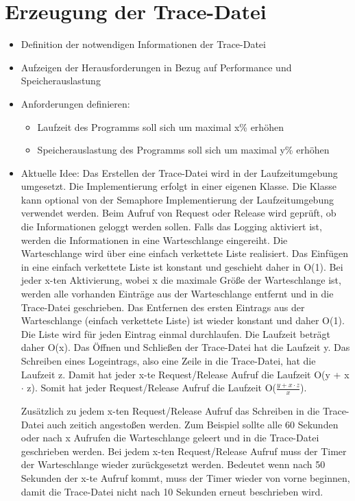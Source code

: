\section{Erzeugung der Trace-Datei}
\label{section:Erzeugung der Trace-Datei}
\begin{itemize}
    \item Definition der notwendigen Informationen der Trace-Datei
    \item Aufzeigen der Herausforderungen in Bezug auf Performance und
    Speicherauslastung
  \item Anforderungen definieren:
  \begin{itemize}
    \item Laufzeit des Programms soll sich um maximal x\% erhöhen
    \item Speicherauslastung des Programms soll sich um maximal y\% erhöhen
  \end{itemize}
    \item Aktuelle Idee:
    Das Erstellen der Trace-Datei wird in der Laufzeitumgebung umgesetzt. Die Implementierung erfolgt in einer eigenen Klasse. Die Klasse kann optional von der Semaphore Implementierung der Laufzeitumgebung verwendet werden.
    Beim Aufruf von Request oder Release wird geprüft, ob die Informationen geloggt werden sollen. Falls das Logging aktiviert ist, werden die Informationen in eine Warteschlange eingereiht. Die Warteschlange wird über eine einfach verkettete Liste realisiert.
    Das Einfügen in eine einfach verkettete Liste ist konstant und geschieht daher in O(1).
    Bei jeder x-ten Aktivierung, wobei x die maximale Größe der Warteschlange ist, werden alle vorhanden Einträge aus der Warteschlange entfernt und in die Trace-Datei geschrieben.
    Das Entfernen des ersten Eintrags aus der Warteschlange (einfach verkettete Liste) ist wieder konstant und daher O(1). Die Liste wird für jeden Eintrag einmal durchlaufen.
    Die Laufzeit beträgt daher O(x). Das Öffnen und Schließen der Trace-Datei hat die Laufzeit y.
    Das Schreiben eines Logeintrags, also eine Zeile in die Trace-Datei, hat die Laufzeit z.
    Damit hat jeder x-te Request/Release Aufruf die Laufzeit O(y + x $\cdot$ z). Somit hat jeder Request/Release Aufruf die Laufzeit O($\frac{y + x \cdot z}{x}$).

    Zusätzlich zu jedem x-ten Request/Release Aufruf das Schreiben in die Trace-Datei auch zeitich angestoßen werden.
    Zum Beispiel sollte alle 60 Sekunden oder nach x Aufrufen die Warteschlange geleert und in die Trace-Datei geschrieben werden. Bei jedem x-ten Request/Release Aufruf muss der Timer der Warteschlange wieder zurückgesetzt werden.
    Bedeutet wenn nach 50 Sekunden der x-te Aufruf kommt, muss der Timer wieder von vorne beginnen, damit die Trace-Datei nicht nach 10 Sekunden erneut beschrieben wird.


\end{itemize}

